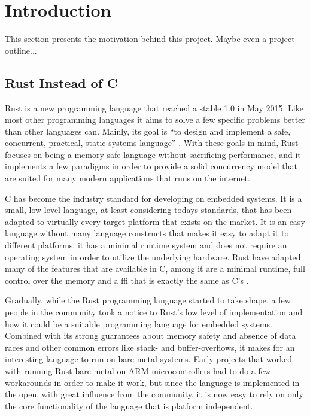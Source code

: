 
\chapter{Introduction}
\label{chap:intro}

This section presents the motivation behind this project.
Maybe even a project outline...

\section{Rust Instead of C} %
\label{sec:intro:rust_as_replacement_to_c}

Rust is a new programming language that reached a stable 1.0 in May 2015.
Like most other programming languages it aims to solve a few specific problems better than other languages can.
Mainly, its goal is ``to design and implement a safe, concurrent, practical, static systems language'' \cite{web:rust_faq}.
With these goals in mind, Rust focuses on being a memory safe language without sacrificing performance, and it implements a few paradigms in order to provide a solid concurrency model that are suited for many modern applications that runs on the internet.

C has become the industry standard for developing on embedded systems.
It is a small, low-level language, at least considering todays standards, that has been adapted to virtually every target platform that exists on the market.
It is an easy language without many language constructs that makes it easy to adapt it to different platforms, it has a minimal runtime system and does not require an operating system in order to utilize the underlying hardware.
Rust have adapted many of the features that are available in C, among it are a minimal runtime, full control over the memory and a \gls{ffi} that is exactly the same as C's \cite{web:rust_run_once_run_everywhere}.

Gradually, while the Rust programming language started to take shape, a few people in the community took a notice to Rust's low level of implementation and how it could be a suitable programming language for embedded systems.
Combined with its strong guarantees about memory safety and absence of data races and other common errors like stack- and buffer-overflows, it makes for an interesting language to run on bare-metal systems.
Early projects that worked with running Rust bare-metal on ARM microcontrollers had to do a few workarounds in order to make it work, but since the language is implemented in the open, with great influence from the community, it is now easy to rely on only the core functionality of the language that is platform independent.

